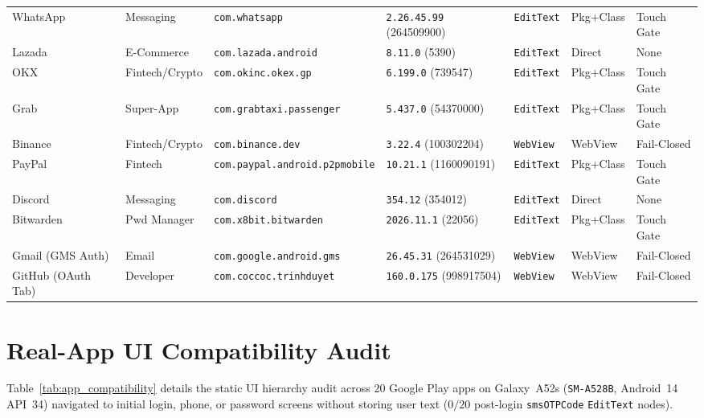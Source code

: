 \begin{table}[t]
\begin{tabular*}{\textwidth}{@{\extracolsep{\fill}}lllllll@{}}
WhatsApp & Messaging & \texttt{com.whatsapp} & \texttt{2.26.45.99} (264509900) & \texttt{EditText} & Pkg+Class & Touch Gate \\
Lazada & E-Commerce & \texttt{com.lazada.android} & \texttt{8.11.0} (5390) & \texttt{EditText} & Direct & None \\
OKX & Fintech/Crypto & \texttt{com.okinc.okex.gp} & \texttt{6.199.0} (739547) & \texttt{EditText} & Pkg+Class & Touch Gate \\
Grab & Super-App & \texttt{com.grabtaxi.passenger} & \texttt{5.437.0} (54370000) & \texttt{EditText} & Pkg+Class & Touch Gate \\
Binance & Fintech/Crypto & \texttt{com.binance.dev} & \texttt{3.22.4} (100302204) & \texttt{WebView} & WebView & Fail-Closed \\
PayPal & Fintech & \texttt{com.paypal.android.p2pmobile} & \texttt{10.21.1} (1160090191) & \texttt{EditText} & Pkg+Class & Touch Gate \\
Discord & Messaging & \texttt{com.discord} & \texttt{354.12} (354012) & \texttt{EditText} & Direct & None \\
Bitwarden & Pwd Manager & \texttt{com.x8bit.bitwarden} & \texttt{2026.11.1} (22056) & \texttt{EditText} & Pkg+Class & Touch Gate \\
Gmail (GMS Auth) & Email & \texttt{com.google.android.gms} & \texttt{26.45.31} (264531029) & \texttt{WebView} & WebView & Fail-Closed \\
GitHub (OAuth Tab) & Developer & \texttt{com.coccoc.trinhduyet} & \texttt{160.0.175} (998917504) & \texttt{WebView} & WebView & Fail-Closed \\
\bottomrule
\end{tabular*}
\end{table}

\section{Real-App UI Compatibility Audit}
\label{sec:appendix_compat}

Table~\ref{tab:app_compatibility} details the static UI hierarchy audit across 20 Google Play apps on Galaxy~A52s (\texttt{SM-A528B}, Android~14 API~34) navigated to initial login, phone, or password screens without storing user text ($0/20$ post-login \texttt{smsOTPCode} \texttt{EditText} nodes).
